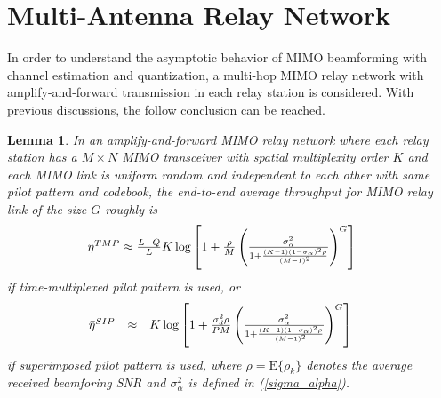 \documentclass[10pt,fleqn, twocolumn]{IEEEtran}
\newtheorem{lemma}{Lemma}
\begin{document}
\section{Multi-Antenna Relay Network}
In order to understand the asymptotic behavior of MIMO beamforming
with channel estimation and quantization, a multi-hop MIMO relay
network with amplify-and-forward transmission in each relay
station is considered. With previous discussions, the follow
conclusion can be reached.
\begin{lemma}
In an amplify-and-forward MIMO relay network where each relay
station has a $M\times N$ MIMO transceiver with spatial
multiplexity order $K$ and each MIMO link is uniform random and
independent to each other with same pilot pattern and codebook,
the end-to-end average throughput for MIMO relay link of the size
$G$ roughly is
\begin{equation}\hspace{-0.20in}
\begin{array}{l}
\bar\eta^{\mbox{\tiny
TMP}}\approx\frac{L-Q}{L}K\log\left[1+\frac{\rho}{M}\left(\frac{\sigma_{\alpha}^{2}}{1+\frac{(K-1)(1-\sigma_{\alpha})^2\rho}{(M-1)^2}}\right)^{G}\right]
\end{array}\label{RN_TM}
\end{equation}
\noindent if time-multiplexed pilot pattern is used, or
\begin{equation}\hspace{-0.23in}
\begin{array}{rcl}
\bar\eta^{\mbox{\tiny
SIP}}&\approx&K\log\left[1+\frac{\sigma_{d}^{2}\rho}{PM}\left(\frac{\sigma_{\alpha}^{2}}{1+\frac{(K-1)(1-\sigma_{\alpha})^2\rho}{(M-1)^2}}\right)^{G}\right]
\end{array}\label{RN_SI}
\end{equation}
\noindent if superimposed pilot pattern is used, where
$\rho=\mbox{E}\{\rho_{k}\}$ denotes the average received
beamforing SNR and $\sigma_{\alpha}^{2}$ is defined in
(\ref{sigma_alpha}).
\end{lemma}
\begin{figure}
\end{figure}
\end{document}
